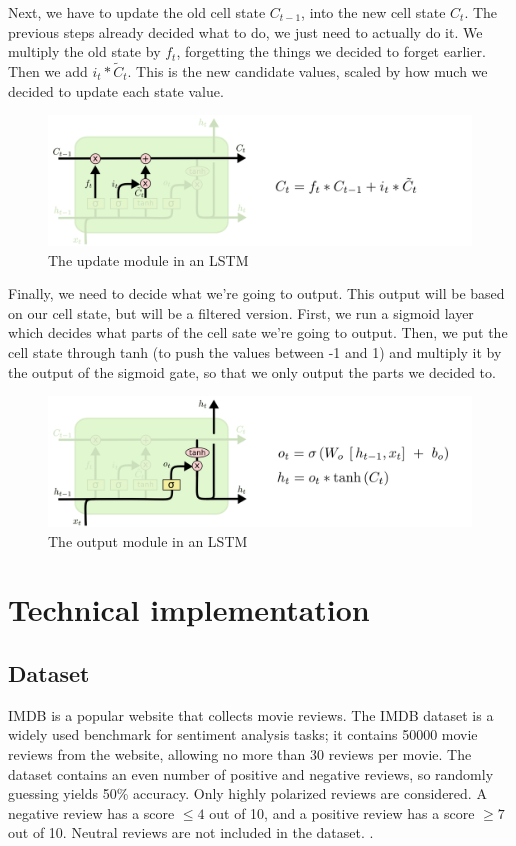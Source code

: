 \documentclass{article}
\begin{document}
Next, we have to update the old cell state $C_{t-1}$, into the new cell state $C_t$.
The previous steps already decided what to do, we just need to actually do it.
We multiply the old state by $f_t$, forgetting the things we decided to forget earlier.
Then we add $i_t * \tilde{C}_t$.
This is the new candidate values, scaled by how much we decided to update each state value.

\begin{figure}[htbp]
  \centering
  \includegraphics[width=0.6\linewidth]{img/lstm_update.png}
  \caption{The update module in an LSTM}
  \label{fig:lstm_update}
\end{figure}

Finally, we need to decide what we're going to output.
This output will be based on our cell state, but will be a filtered version.
First, we run a sigmoid layer which decides what parts of the cell sate we're going to output.
Then, we put the cell state through tanh (to push the values between -1 and 1) and multiply it by the output of the sigmoid gate, so that we only output the parts we decided to.

\begin{figure}[htbp]
  \centering
  \includegraphics[width=0.6\linewidth]{img/lstm_output.png}
  \caption{The output module in an LSTM}
  \label{fig:lstm_output}
\end{figure}



\section{Technical implementation}

\subsection{Dataset}
IMDB is a popular website that collects movie reviews.
The IMDB dataset is a widely used benchmark for sentiment analysis tasks;
it contains 50000 movie reviews from the website, allowing no more than 30 reviews per movie.
The dataset contains an even number of positive and negative reviews, so randomly guessing yields 50\% accuracy.
Only highly polarized reviews are considered.
A negative review has a score $\leq 4$ out of 10, and a positive review has a score $\geq 7$ out of 10. Neutral reviews are not included in the dataset. \cite{imdb_dataset_stanfordnlp}. 
\end{document}
